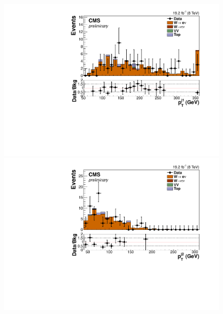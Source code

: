 \begin{figure}
  \includegraphics[width=.65\largefigwidth]{plots/parked/HIG-14-038-figs/output_sigreg/enu_jet1_pt.pdf}
  \includegraphics[width=.65\largefigwidth]{plots/parked/HIG-14-038-figs/output_sigreg/enu_jet2_pt.pdf}


\end{figure}
